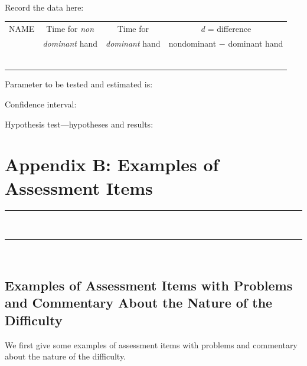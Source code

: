 \documentclass[twoside,openany]{tufte-book}
\begin{document}
\noindent {}\\
\vspace{14pt}
\noindent Record the data here:\\

\begin{table}[!ht]
\begin{center}
\begin{tabular}{|l|c|c|c|}
\hline
NAME \hspace{1.5in} & Time for \textit{non} & Time for & \textit{d} = difference\\
& \textit{dominant} hand & \textit{dominant} hand & nondominant $-$ dominant hand\\[.2em]
  \hline
 & & &\\[.6em]
\hline
 & & &\\[.6em]
\hline
 & & &\\[.6em]
\hline
 & & &\\[.6em]
\hline
 & & &\\[.6em]
\hline
 & & &\\[.6em]
\hline
\end{tabular}
\end{center}
\end{table}

\noindent Parameter to be tested and estimated is:\\

\vspace{.25\textheight}

\noindent Confidence interval:\\

\vspace{.25\textheight}

\noindent Hypothesis test---hypotheses and results:


\chapter{Appendix B: Examples of Assessment Items}
\vspace{-.53in}
   \noindent\color{graylight}\rule[0cm]{3.25in}{0.03cm} \\
    \noindent\color{graylight}\rule[0.4cm]{3.25in}{0.03cm} \\
\color{black}
\vspace{-.25in}


\section{\textbf{Examples of Assessment Items with Problems and Commentary About the Nature of the Difficulty}}
We first give some examples of assessment items with problems and commentary about the nature of the difficulty.
\end{document}
